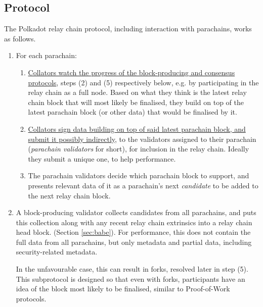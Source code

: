 \documentclass{article}
\begin{document}

\subsection{Protocol}

The Polkadot relay chain protocol, including interaction with parachains, works as follows.

\begin{enumerate}
	\item For each parachain:
	
	\begin{enumerate}
		\item \uline{Collators watch the progress of the block-producing and consensus protocols}, steps (2) and (5) respectively below, e.g. by participating in the relay chain as a full node. Based on what they think is the latest relay chain block that will most likely be finalised, they build on top of the latest parachain block (or other data) that would be finalised by it.
		\item \uline{Collators sign data building on top of said latest parachain block, and submit it possibly indirectly}, to the validators assigned to their parachain (\emph{parachain validators} for short), for inclusion in the relay chain. Ideally they submit a unique one, to help performance.
		\item The parachain validators decide which parachain block to support, and presents relevant data of it as a parachain's next \emph{candidate} to be added to the next relay chain block.
	\end{enumerate}
	
	\item A block-producing validator collects candidates from all parachains, and puts this collection along with any recent relay chain extrinsics into a relay chain head block. (Section \ref{sec:babe}). For performance, this does not contain the full data from all parachains, but only metadata and partial data, including security-related metadata.
	
	In the unfavourable case, this can result in forks, resolved later in step (5). This subprotocol is designed so that even with forks, participants have an idea of the block most likely to be finalised, similar to Proof-of-Work protocols.
	

\end{enumerate}
\end{document}
